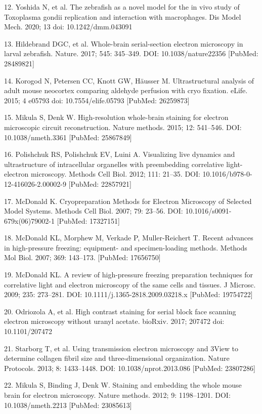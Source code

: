 \documentclass{article}
\begin{document}
\begin{hangpars}
12. Yoshida N, et al. The zebrafish as a novel model for the in vivo study of Toxoplasma gondii replication and interaction with macrophages. Dis Model Mech. 2020; 13 doi: 10.1242/dmm.043091

13. Hildebrand DGC, et al. Whole-brain serial-section electron microscopy in larval zebrafish. Nature. 2017; 545: 345–349. DOI: 10.1038/nature22356 [PubMed: 28489821]

14. Korogod N, Petersen CC, Knott GW, Häusser M. Ultrastructural analysis of adult mouse neocortex comparing aldehyde perfusion with cryo fixation. eLife. 2015; 4 e05793 doi: 10.7554/elife.05793 [PubMed: 26259873]

15. Mikula S, Denk W. High-resolution whole-brain staining for electron microscopic circuit reconstruction. Nature methods. 2015; 12: 541–546. DOI: 10.1038/nmeth.3361 [PubMed: 25867849]

16. Polishchuk RS, Polishchuk EV, Luini A. Visualizing live dynamics and ultrastructure of intracellular organelles with preembedding correlative light-electron microscopy. Methods Cell Biol. 2012; 111: 21–35. DOI: 10.1016/b978-0-12-416026-2.00002-9 [PubMed: 22857921]

17. McDonald K. Cryopreparation Methods for Electron Microscopy of Selected Model Systems. Methods Cell Biol. 2007; 79: 23–56. DOI: 10.1016/s0091-679x(06)79002-1 [PubMed: 17327151]

18. McDonald KL, Morphew M, Verkade P, Muller-Reichert T. Recent advances in high-pressure freezing: equipment- and specimen-loading methods. Methods Mol Biol. 2007; 369: 143–173. [PubMed: 17656750]

19. McDonald KL. A review of high-pressure freezing preparation techniques for correlative light and electron microscopy of the same cells and tissues. J Microsc. 2009; 235: 273–281. DOI: 10.1111/j.1365-2818.2009.03218.x [PubMed: 19754722]

20. Odriozola A, et al. High contrast staining for serial block face scanning electron microscopy without uranyl acetate. bioRxiv. 2017; 207472 doi: 10.1101/207472

21. Starborg T, et al. Using transmission electron microscopy and 3View to determine collagen fibril size and three-dimensional organization. Nature Protocols. 2013; 8: 1433–1448. DOI: 10.1038/nprot.2013.086 [PubMed: 23807286]

22. Mikula S, Binding J, Denk W. Staining and embedding the whole mouse brain for electron microscopy. Nature methods. 2012; 9: 1198–1201. DOI: 10.1038/nmeth.2213 [PubMed: 23085613]


\end{hangpars}
\end{document}
